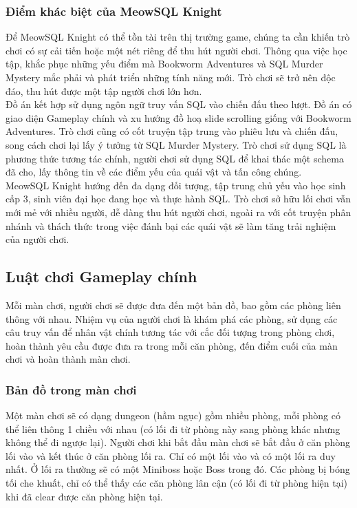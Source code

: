 \subsubsection{Điểm khác biệt của MeowSQL Knight}
\hspace*{0.5cm} Để MeowSQL Knight có thể tồn tài trên thị trường game, chúng ta cần khiến trò chơi có sự cải tiến hoặc một nét riêng để thu hút người chơi. Thông qua việc học tập, khắc phục những yếu điểm mà Bookworm Adventures và SQL Murder Mystery mắc phải và phát triển những tính năng mới. Trò chơi sẽ trở nên độc đáo, thu hút được một tập người chơi lớn hơn.\\
\hspace*{0.5cm} Đồ án kết hợp sử dụng ngôn ngữ truy vấn SQL vào chiến đấu theo lượt. Đồ án có giao diện Gameplay chính và xu hướng đồ hoạ slide scrolling giống với Bookworm Adventures. Trò chơi cũng có cốt truyện tập trung vào phiêu lưu và chiến đấu, song cách chơi lại lấy ý tưởng từ SQL Murder Mystery. Trò chơi sử dụng SQL là phương thức tương tác chính, người chơi sử dụng SQL để khai thác một schema đã cho, lấy thông tin về các điểm yếu của quái vật và tấn công chúng.\\
\hspace*{0.5cm} MeowSQL Knight hướng đến đa dạng đối tượng, tập trung chủ yếu vào học sinh cấp 3, sinh viên đại học đang học và thực hành SQL. Trò chơi sở hữu lối chơi vẫn mới mẻ với nhiều người, dễ dàng thu hút người chơi, ngoài ra với cốt truyện phân nhánh và thách thức trong việc đánh bại các quái vật sẽ làm tăng trải nghiệm của người chơi.


\subsection{Luật chơi Gameplay chính}
\hspace*{0.5cm} Mỗi màn chơi, người chơi sẽ được đưa đến một bản đồ, bao gồm các phòng liên thông với nhau. Nhiệm vụ của người chơi là khám phá các phòng, sử dụng các câu truy vấn để nhân vật chính tương tác với cắc đối tượng trong phòng chơi, hoàn thành yêu cầu được đưa ra trong mỗi căn phòng, đến điểm cuối của màn chơi và hoàn thành màn chơi.

\subsubsection{Bản đồ trong màn chơi}
\hspace*{0.5cm} Một màn chơi sẽ có dạng dungeon (hầm ngục) gồm nhiều phòng, mỗi phòng có thể liên thông 1 chiều với nhau (có lối đi từ phòng này sang phòng khác nhưng không thể đi ngược lại). Người chơi khi bắt đầu màn chơi sẽ bắt đầu ở căn phòng lối vào và kết thúc ở căn phòng lối ra. Chỉ có một lối vào và có một lối ra duy nhất. Ở lối ra thường sẽ có một Miniboss hoặc Boss trong đó. Các phòng bị bóng tối che khuất, chỉ có thể thấy các căn phòng lân cận (có lối đi từ phòng hiện tại) khi đã clear được căn phòng hiện tại.\\

